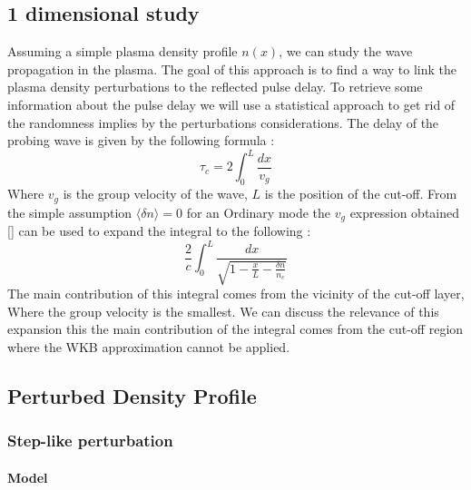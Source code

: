 \documentclass[11pt,a4paper]{report}
\begin{document}
\begin{multicols}{2}
    \section{1 dimensional study}
    Assuming a simple plasma density profile $n(x)$, we can study the wave propagation in the plasma. The goal of this approach is to find a way to link the plasma density perturbations to the reflected pulse delay. To retrieve some information about the pulse delay we will
    use a statistical approach to get rid of the randomness implies by the perturbations considerations.
    The delay of the probing wave is given by the following formula  : $$\tau_c = 2 \int_0^L \frac{dx}{v_g}$$ Where $v_g$ is the group velocity of the wave, $L$ is the position of the cut-off.
    From the simple assumption $\langle \delta n \rangle = 0 $ for an Ordinary mode the  $v_g$ expression obtained [] can be used to expand the integral to the following :
    $$\frac{2}{c} \int_0^L \frac{dx}{\sqrt{1 - \frac{x}{L} - \frac{\delta n }{n_c}}}$$ The main contribution of this integral comes from the vicinity of the cut-off layer, Where the group velocity is the smallest.
    We can discuss the relevance of this expansion this the main contribution of the integral comes from the cut-off region where the WKB approximation cannot be applied.

    \subsection{Perturbed Density Profile}
    \subsubsection{Step-like perturbation}
    \paragraph{Model}


\end{multicols}
\end{document}

